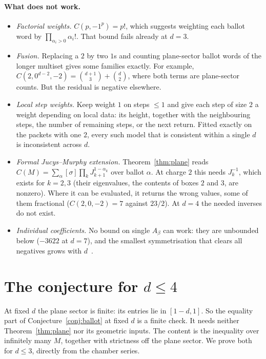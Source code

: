 \documentclass[11pt,a4paper]{article}
\theoremstyle{plain}
\theoremstyle{definition}
\theoremstyle{remark}
\begin{document}
\paragraph{What does not work.}
\begin{itemize}[nosep]
\item \emph{Factorial weights.} $C(p, -1^p) = p!$, which suggests weighting each ballot word by
  $\prod_{\alpha_i > 0} \alpha_i!$. That bound fails already at $d = 3$.
\item \emph{Fusion.} Replacing a $2$ by two $1$s and counting plane-sector ballot words of the
  longer multiset gives some families exactly. For example, $C(2, 0^{d-2}, -2) = \binom{d+1}{3} +
  \binom{d}{2}$, where both terms are plane-sector counts. But the residual is negative elsewhere.
\item \emph{Local step weights.} Keep weight $1$ on steps $\le 1$ and give each step of size $2$ a
  weight depending on local data: its height, together with the neighbouring steps, the number of
  remaining steps, or the next return. Fitted exactly on the packets with one $2$, every such model
  that is consistent within a single $d$ is inconsistent across $d$.
\item \emph{Formal Jucys--Murphy extension.} Theorem~\ref{thm:plane} reads $C(M) = \sum_{\alpha}
  [\sigma] \prod_k J_{k+1}^{1-\alpha_k}$ over ballot $\alpha$. At charge $2$ this needs $J_k^{-1}$,
  which exists for $k = 2, 3$ (their eigenvalues, the contents of boxes $2$ and $3$, are nonzero).
  Where it can be evaluated, it returns the wrong values, some of them fractional ($C(2,0,-2) = 7$
  against $23/2$). At $d = 4$ the needed inverses do not exist.
\item \emph{Individual coefficients.} No bound on single $A_\beta$ can work: they are unbounded
  below ($-3622$ at $d = 7$), and the smallest symmetrisation that clears all negatives grows with
  $d$~\cite{Rep}.
\end{itemize}

\section{The conjecture for $d \le 4$}

At fixed $d$ the plane sector is finite: its entries lie in $[1-d, 1]$. So the equality part of
Conjecture~\ref{conj:ballot} at fixed $d$ is a finite check. It needs neither
Theorem~\ref{thm:plane} nor its geometric inputs. The content is the inequality over infinitely
many $M$, together with strictness off the plane sector. We prove both for $d \le 3$, directly from
the chamber series.
\end{document}
